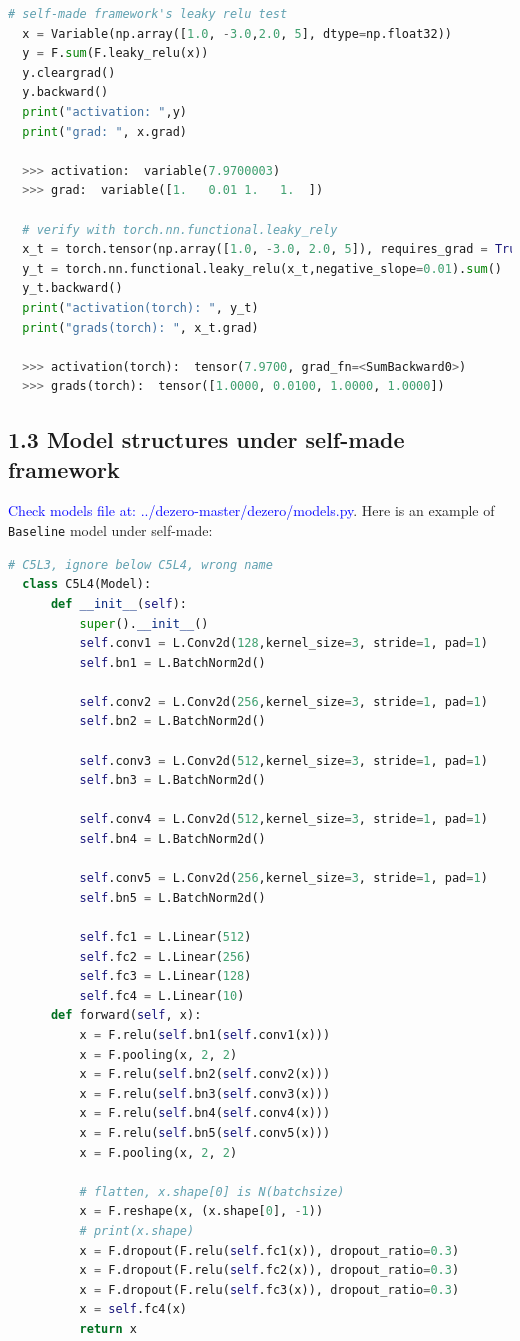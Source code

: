 \documentclass{article}
\newcommand{\subs}[1]{\subsection*{#1}}
\begin{document}
\begin{lstlisting}[language=python]
  # self-made framework's leaky relu test
  x = Variable(np.array([1.0, -3.0,2.0, 5], dtype=np.float32))
  y = F.sum(F.leaky_relu(x))
  y.cleargrad()
  y.backward()
  print("activation: ",y)
  print("grad: ", x.grad)
  
  >>> activation:  variable(7.9700003)
  >>> grad:  variable([1.   0.01 1.   1.  ])

  # verify with torch.nn.functional.leaky_rely 
  x_t = torch.tensor(np.array([1.0, -3.0, 2.0, 5]), requires_grad = True,  dtype = torch.float32)
  y_t = torch.nn.functional.leaky_relu(x_t,negative_slope=0.01).sum()
  y_t.backward()
  print("activation(torch): ", y_t)
  print("grads(torch): ", x_t.grad)

  >>> activation(torch):  tensor(7.9700, grad_fn=<SumBackward0>)
  >>> grads(torch):  tensor([1.0000, 0.0100, 1.0000, 1.0000])
\end{lstlisting}

\subs{1.3 Model structures under self-made framework}
\noindent\textcolor{blue}{Check models file at: ../dezero-master/dezero/models.py}. Here is an example of \texttt{Baseline} model under self-made:
\begin{lstlisting}[language=python]
  # C5L3, ignore below C5L4, wrong name
  class C5L4(Model):
      def __init__(self):
          super().__init__()
          self.conv1 = L.Conv2d(128,kernel_size=3, stride=1, pad=1)
          self.bn1 = L.BatchNorm2d()
  
          self.conv2 = L.Conv2d(256,kernel_size=3, stride=1, pad=1)
          self.bn2 = L.BatchNorm2d()
  
          self.conv3 = L.Conv2d(512,kernel_size=3, stride=1, pad=1)
          self.bn3 = L.BatchNorm2d()
  
          self.conv4 = L.Conv2d(512,kernel_size=3, stride=1, pad=1)
          self.bn4 = L.BatchNorm2d()
  
          self.conv5 = L.Conv2d(256,kernel_size=3, stride=1, pad=1)
          self.bn5 = L.BatchNorm2d()
  
          self.fc1 = L.Linear(512)
          self.fc2 = L.Linear(256)
          self.fc3 = L.Linear(128)
          self.fc4 = L.Linear(10)
      def forward(self, x):
          x = F.relu(self.bn1(self.conv1(x)))
          x = F.pooling(x, 2, 2)
          x = F.relu(self.bn2(self.conv2(x)))
          x = F.relu(self.bn3(self.conv3(x)))
          x = F.relu(self.bn4(self.conv4(x)))
          x = F.relu(self.bn5(self.conv5(x)))
          x = F.pooling(x, 2, 2)
  
          # flatten, x.shape[0] is N(batchsize)
          x = F.reshape(x, (x.shape[0], -1))
          # print(x.shape)
          x = F.dropout(F.relu(self.fc1(x)), dropout_ratio=0.3)
          x = F.dropout(F.relu(self.fc2(x)), dropout_ratio=0.3)
          x = F.dropout(F.relu(self.fc3(x)), dropout_ratio=0.3)
          x = self.fc4(x)
          return x
\end{lstlisting}
\end{document}
